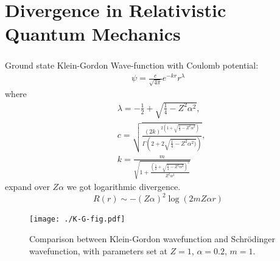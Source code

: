 \documentclass[8pt]{beamer}
\renewcommand{\a}{\alpha}
\begin{document}
\section{Divergence in Relativistic Quantum Mechanics}
\begin{frame}
	\frametitle{\insertsectionhead}
	\begin{minipage}{0.43\linewidth}
		Ground state Klein-Gordon Wave-function with Coulomb potential:
		\begin{align}
			\psi  =\frac{c}{\sqrt{4\pi}}e^{-kr}r^\lambda
		\end{align}
		where
		\begin{align*}
			  & \lambda=-\frac{1}{2}+\sqrt{\frac{1}{4}-Z^2\alpha^2},\; \\&  c=\sqrt{\frac{(2k)^{2(1+\sqrt{\frac{1}{4}-Z^2\alpha^2})}}{\Gamma(2+2\sqrt{\frac{1}{4}-Z^2\alpha^2)})}},\\&    k=\frac{m}{\sqrt{1+\frac{(\frac{1}{2}+\sqrt{\frac{1}{4}-Z^2\alpha^2})^2}{Z^2\alpha^2}}}
		\end{align*}
		expand over $Z\a$ we got logarithmic divergence.
		$$R(r)          \sim-(Z\alpha)^2\log(2m Z \a r)   $$
	\end{minipage}
	\begin{minipage}{0.5\linewidth}
		\begin{figure}
			\centering
			\texttt{[image: ./K-G-fig.pdf]}
			\caption{Comparison between Klein-Gordon wavefunction and Schr\"odinger wavefunction, with parameters set at $Z=1$, $\a=0.2$, $m=1$. }
		\end{figure}
	\end{minipage}
\end{frame}
\end{document}
